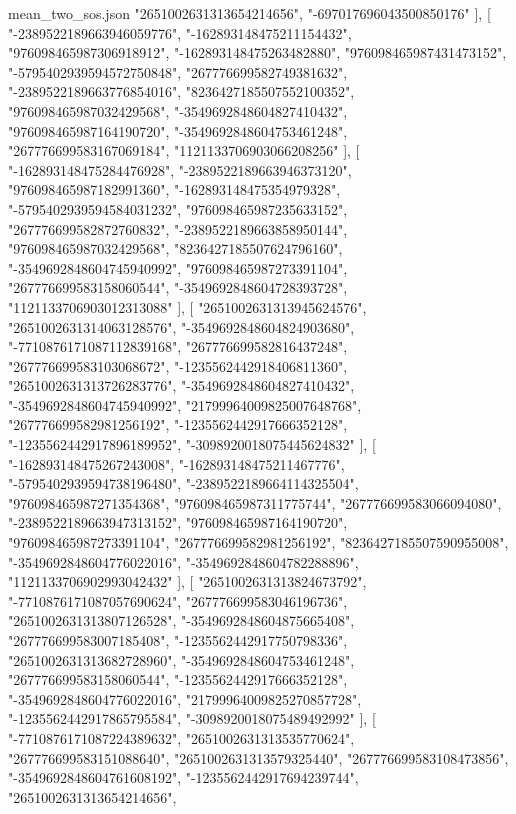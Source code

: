 \begin{filecontents*}[overwrite]{mean_two_sos.json}
    "2651002631313654214656",
    "-697017696043500850176"
   ],
   [
    "-2389522189663946059776",
    "-162893148475211154432",
    "976098465987306918912",
    "-162893148475263482880",
    "976098465987431473152",
    "-5795402939594572750848",
    "267776699582749381632",
    "-2389522189663776854016",
    "8236427185507552100352",
    "976098465987032429568",
    "-3549692848604827410432",
    "976098465987164190720",
    "-3549692848604753461248",
    "267776699583167069184",
    "1121133706903066208256"
   ],
   [
    "-162893148475284476928",
    "-2389522189663946373120",
    "976098465987182991360",
    "-162893148475354979328",
    "-5795402939594584031232",
    "976098465987235633152",
    "267776699582872760832",
    "-2389522189663858950144",
    "976098465987032429568",
    "8236427185507624796160",
    "-3549692848604745940992",
    "976098465987273391104",
    "267776699583158060544",
    "-3549692848604728393728",
    "1121133706903012313088"
   ],
   [
    "2651002631313945624576",
    "2651002631314063128576",
    "-3549692848604824903680",
    "-7710876171087112839168",
    "267776699582816437248",
    "267776699583103068672",
    "-1235562442918406811360",
    "2651002631313726283776",
    "-3549692848604827410432",
    "-3549692848604745940992",
    "21799964009825007648768",
    "267776699582981256192",
    "-1235562442917666352128",
    "-1235562442917896189952",
    "-3098920018075445624832"
   ],
   [
    "-162893148475267243008",
    "-162893148475211467776",
    "-5795402939594738196480",
    "-2389522189664114325504",
    "976098465987271354368",
    "976098465987311775744",
    "267776699583066094080",
    "-2389522189663947313152",
    "976098465987164190720",
    "976098465987273391104",
    "267776699582981256192",
    "8236427185507590955008",
    "-3549692848604776022016",
    "-3549692848604782288896",
    "1121133706902993042432"
   ],
   [
    "2651002631313824673792",
    "-7710876171087057690624",
    "267776699583046196736",
    "2651002631313807126528",
    "-3549692848604875665408",
    "267776699583007185408",
    "-1235562442917750798336",
    "2651002631313682728960",
    "-3549692848604753461248",
    "267776699583158060544",
    "-1235562442917666352128",
    "-3549692848604776022016",
    "21799964009825270857728",
    "-1235562442917865795584",
    "-3098920018075489492992"
   ],
   [
    "-7710876171087224389632",
    "2651002631313535770624",
    "267776699583151088640",
    "2651002631313579325440",
    "267776699583108473856",
    "-3549692848604761608192",
    "-1235562442917694239744",
    "2651002631313654214656",

\end{filecontents*}
